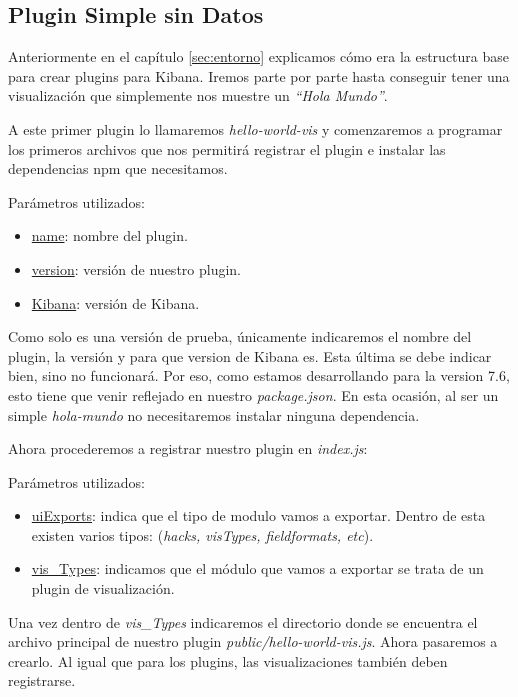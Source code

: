 \documentclass[a4paper, 12pt]{book}
\begin{document}
\subsection{Plugin Simple sin Datos}
\label{sec:holamundo}
Anteriormente en el capítulo \ref{sec:entorno}  explicamos cómo era la estructura base para crear plugins para Kibana. Iremos parte por parte hasta conseguir tener una visualización que simplemente nos muestre un \textit{“Hola Mundo”}.

A este primer plugin lo llamaremos \textit{hello-world-vis} y comenzaremos a programar los primeros archivos que nos permitirá registrar el plugin e instalar las dependencias npm que necesitamos.



Parámetros utilizados:
\begin{itemize}
    \item \underline{name}: nombre del plugin.
    \item \underline{version}: versión de nuestro plugin.
    \item \underline{Kibana}: versión de Kibana.
\end{itemize}

Como solo es una versión de prueba, únicamente indicaremos el nombre del plugin, la versión y para que version de Kibana es. Esta última se debe indicar bien, sino no funcionará. Por eso, como estamos desarrollando para la version 7.6, esto tiene que venir reflejado en nuestro \textit{package.json}. En esta ocasión, al ser un simple \textit{hola-mundo} no necesitaremos instalar ninguna dependencia.

Ahora procederemos a registrar nuestro plugin en \textit{index.js}:



Parámetros utilizados:
\begin{itemize}
    \item \underline{uiExports}: indica que el tipo de modulo vamos a exportar. Dentro de esta existen varios tipos: (\textit{hacks, visTypes, fieldformats, etc}).
    \item \underline{vis\_Types}: indicamos que el módulo que vamos a exportar se trata de un plugin de visualización.
\end{itemize}

Una vez dentro de \textit{vis\_Types} indicaremos el directorio donde se encuentra el archivo principal de nuestro plugin \textit{public/hello-world-vis.js}. Ahora pasaremos a crearlo. Al igual que para los plugins, las visualizaciones también deben registrarse. 
\end{document}
